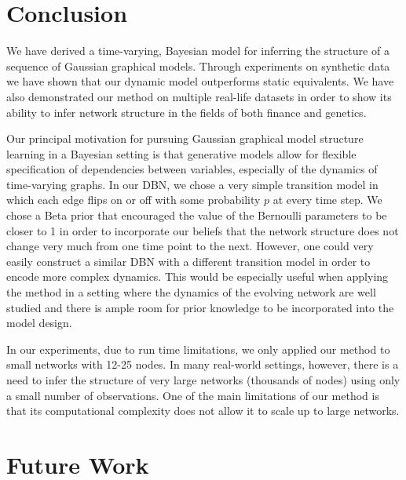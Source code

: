 \documentclass{article}
\begin{document}
\section{Conclusion}
\label{sec:conclusion}

We have derived a time-varying, Bayesian model for inferring the structure of a sequence of Gaussian graphical models. Through experiments on synthetic data we have shown that our dynamic model outperforms static equivalents. We have also demonstrated our method on multiple real-life datasets in order to show its ability to infer network structure in the fields of both finance and genetics. 

Our principal motivation for pursuing Gaussian graphical model structure learning in a Bayesian setting is that generative models allow for flexible specification of dependencies between variables, especially of the dynamics of time-varying graphs. In our DBN, we chose a very simple transition model in which each edge flips on or off with some probability $p$ at every time step. We chose a Beta prior that encouraged the value of the Bernoulli parameters to be closer to 1 in order to incorporate our beliefs that the network structure does not change very much from one time point to the next. However, one could very easily construct a similar DBN with a different transition model in order to encode more complex dynamics. This would be especially useful when applying the method in a setting where the dynamics of the evolving network are well studied and there is ample room for prior knowledge to be incorporated into the model design.

In our experiments, due to run time limitations, we only applied our method to small networks with 12-25 nodes. 
In many real-world settings, however, there is a need to infer the structure of very large networks (thousands of nodes) using only a small number of observations. One of the main limitations of our method is that its computational complexity does not allow it to scale up to large networks. 

\section{Future Work}
\label{sec:future_work}
\end{document}
